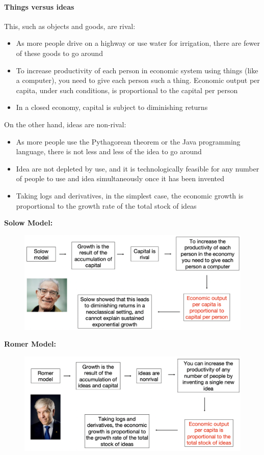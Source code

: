 \documentclass[a4paper]{extarticle}
\begin{document}
\paragraph{Things versus ideas} This, such as objects and goods, are rival:

\begin{itemize}
    \item As more people drive on a highway or use water for irrigation, there are fewer of these goods to go around
    \item To increase productivity of each person in economic system using things (like a computer), you need to give each person such a thing. Economic output per capita, under such conditions, is proportional to the capital per person
    \item In a closed economy, capital is subject to diminishing returns
\end{itemize}

On the other hand, ideas are non-rival:

\begin{itemize}
    \item As more people use the Pythagorean theorem or the Java programming language, there is not less and less of the idea to go around
    \item Idea are not depleted by use, and it is technologically feasible for any number of people to use and idea simultaneously once it has been invented
    \item Taking logs and derivatives, in the simplest case, the economic growth is proportional to the growth rate of the total stock of ideas
\end{itemize}

\textbf{Solow Model:}

\begin{figure}[H]
    \includegraphics[width=15cm]{../images/EnpRisk_Fig10-2}
    \centering
\end{figure}

\textbf{Romer Model:}

\begin{figure}[H]
    \includegraphics[width=15cm]{../images/EnpRisk_Fig10-3}
    \centering
\end{figure}
\end{document}

